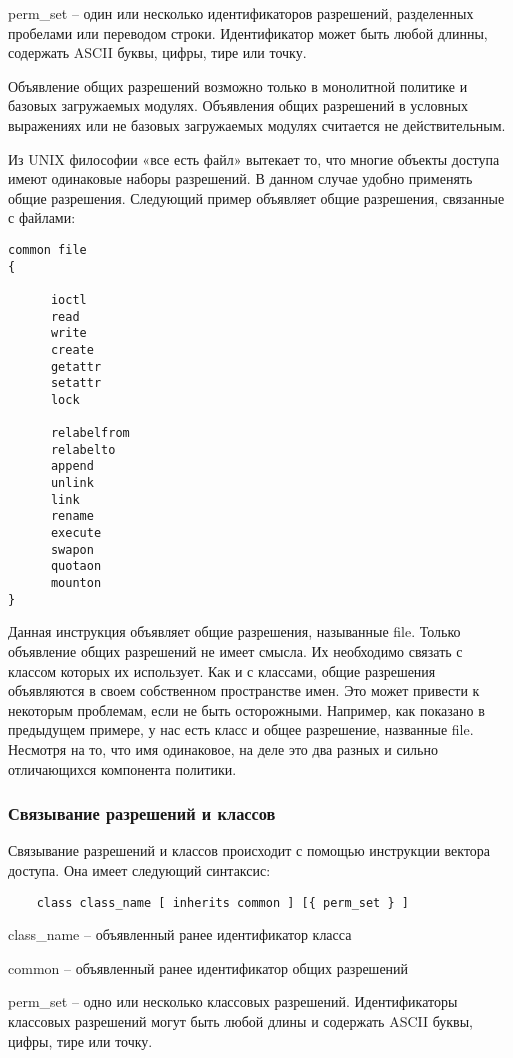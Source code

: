 \documentclass{./../class/UIR}
\begin{document}
perm\_set – один или несколько идентификаторов разрешений, разделенных пробелами
или переводом строки. Идентификатор может быть любой длинны, содержать ASCII
буквы, цифры, тире или точку.

Объявление общих разрешений возможно только в монолитной политике и базовых
загружаемых модулях. Объявления общих разрешений в условных выражениях или не
базовых загружаемых модулях считается не действительным.

Из UNIX философии «все есть файл» вытекает то, что многие объекты доступа имеют
одинаковые наборы разрешений. В данном случае удобно применять общие разрешения.
Следующий пример объявляет общие разрешения, связанные с файлами:
\begin{verbatim}
common file
{

      ioctl
      read
      write
      create
      getattr
      setattr
      lock

      relabelfrom
      relabelto
      append
      unlink
      link
      rename
      execute
      swapon
      quotaon
      mounton
}
\end{verbatim}
Данная инструкция объявляет общие разрешения, называнные file. Только объявление
общих разрешений не имеет смысла. Их необходимо связать с классом которых их
использует.
Как и с классами, общие разрешения объявляются в своем собственном пространстве
имен. Это может привести к некоторым проблемам, если не быть осторожными.
Например, как показано в предыдущем примере, у нас есть класс и общее
разрешение, названные file. Несмотря на то, что имя одинаковое, на деле это два
разных и сильно отличающихся компонента политики.
    
    \subsubsection{Связывание разрешений и классов}
    Связывание разрешений и классов происходит с помощью инструкции вектора
    доступа. Она имеет следующий синтаксис:
	
	\begin{verbatim}
	class class_name [ inherits common ] [{ perm_set } ]
	\end{verbatim}
	
	class\_name – объявленный ранее идентификатор класса
	
	common – объявленный ранее идентификатор общих разрешений
	
	perm\_set – одно или несколько классовых разрешений. Идентификаторы классовых
разрешений могут быть любой длины и содержать ASCII буквы, цифры, тире или точку.
\end{document}
